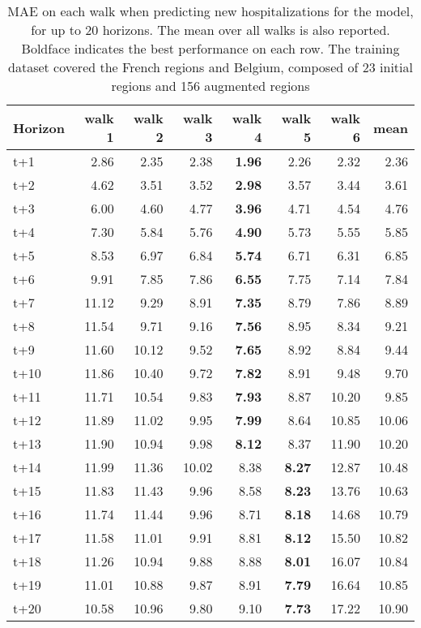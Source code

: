 \begin{table}[H]
\centering
\caption{MAE on each walk when predicting new hospitalizations for the model, for up to 20 horizons. The mean over all walks is also reported. Boldface indicates the best performance on each row. The training dataset covered the French regions and Belgium, composed of 23 initial regions and 156 augmented regions }
\label{tab:MAE_walk_dense_model}
\begin{tabular}{lrrrrrrr}
\toprule
Horizon &  walk 1 &  walk 2 &  walk 3 &  walk 4 &  walk 5 &  walk 6 &  mean \\
\midrule
t+1  & 2.86  & 2.35  & 2.38  & \textbf{1.96}  & 2.26  & 2.32  & 2.36  \\
t+2  & 4.62  & 3.51  & 3.52  & \textbf{2.98}  & 3.57  & 3.44  & 3.61  \\
t+3  & 6.00  & 4.60  & 4.77  & \textbf{3.96}  & 4.71  & 4.54  & 4.76  \\
t+4  & 7.30  & 5.84  & 5.76  & \textbf{4.90}  & 5.73  & 5.55  & 5.85  \\
t+5  & 8.53  & 6.97  & 6.84  & \textbf{5.74}  & 6.71  & 6.31  & 6.85  \\
t+6  & 9.91  & 7.85  & 7.86  & \textbf{6.55}  & 7.75  & 7.14  & 7.84  \\
t+7  & 11.12  & 9.29  & 8.91  & \textbf{7.35}  & 8.79  & 7.86  & 8.89  \\
t+8  & 11.54  & 9.71  & 9.16  & \textbf{7.56}  & 8.95  & 8.34  & 9.21  \\
t+9  & 11.60  & 10.12  & 9.52  & \textbf{7.65}  & 8.92  & 8.84  & 9.44  \\
t+10  & 11.86  & 10.40  & 9.72  & \textbf{7.82}  & 8.91  & 9.48  & 9.70  \\
t+11  & 11.71  & 10.54  & 9.83  & \textbf{7.93}  & 8.87  & 10.20  & 9.85  \\
t+12  & 11.89  & 11.02  & 9.95  & \textbf{7.99}  & 8.64  & 10.85  & 10.06  \\
t+13  & 11.90  & 10.94  & 9.98  & \textbf{8.12}  & 8.37  & 11.90  & 10.20  \\
t+14  & 11.99  & 11.36  & 10.02  & 8.38  & \textbf{8.27}  & 12.87  & 10.48  \\
t+15  & 11.83  & 11.43  & 9.96  & 8.58  & \textbf{8.23}  & 13.76  & 10.63  \\
t+16  & 11.74  & 11.44  & 9.96  & 8.71  & \textbf{8.18}  & 14.68  & 10.79  \\
t+17  & 11.58  & 11.01  & 9.91  & 8.81  & \textbf{8.12}  & 15.50  & 10.82  \\
t+18  & 11.26  & 10.94  & 9.88  & 8.88  & \textbf{8.01}  & 16.07  & 10.84  \\
t+19  & 11.01  & 10.88  & 9.87  & 8.91  & \textbf{7.79}  & 16.64  & 10.85  \\
t+20  & 10.58  & 10.96  & 9.80  & 9.10  & \textbf{7.73}  & 17.22  & 10.90  \\

\bottomrule
\end{tabular}
\end{table}

